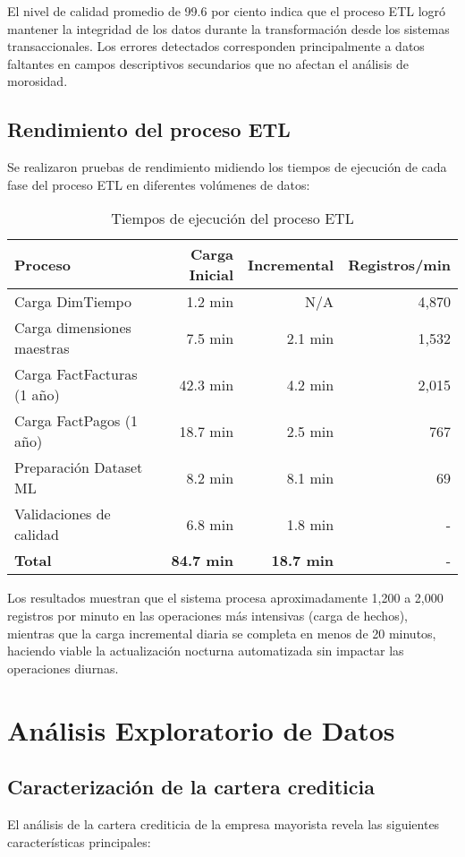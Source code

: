 El nivel de calidad promedio de 99.6 por ciento indica que el proceso ETL logró mantener la integridad de los datos durante la transformación desde los sistemas transaccionales. Los errores detectados corresponden principalmente a datos faltantes en campos descriptivos secundarios que no afectan el análisis de morosidad.

\subsection{Rendimiento del proceso ETL}

Se realizaron pruebas de rendimiento midiendo los tiempos de ejecución de cada fase del proceso ETL en diferentes volúmenes de datos:

\begin{table}[ht]
\centering
\begin{tabular}{|l|r|r|r|}
\hline
\textbf{Proceso} & \textbf{Carga Inicial} & \textbf{Incremental} & \textbf{Registros/min} \\
\hline
Carga DimTiempo & 1.2 min & N/A & 4,870 \\
Carga dimensiones maestras & 7.5 min & 2.1 min & 1,532 \\
Carga FactFacturas (1 año) & 42.3 min & 4.2 min & 2,015 \\
Carga FactPagos (1 año) & 18.7 min & 2.5 min & 767 \\
Preparación Dataset ML & 8.2 min & 8.1 min & 69 \\
Validaciones de calidad & 6.8 min & 1.8 min & - \\
\hline
\textbf{Total} & \textbf{84.7 min} & \textbf{18.7 min} & - \\
\hline
\end{tabular}
\caption{Tiempos de ejecución del proceso ETL}
\end{table}

Los resultados muestran que el sistema procesa aproximadamente 1,200 a 2,000 registros por minuto en las operaciones más intensivas (carga de hechos), mientras que la carga incremental diaria se completa en menos de 20 minutos, haciendo viable la actualización nocturna automatizada sin impactar las operaciones diurnas.
\section{Análisis Exploratorio de Datos}
\subsection{Caracterización de la cartera crediticia}
El análisis de la cartera crediticia de la empresa mayorista revela las siguientes características principales:


